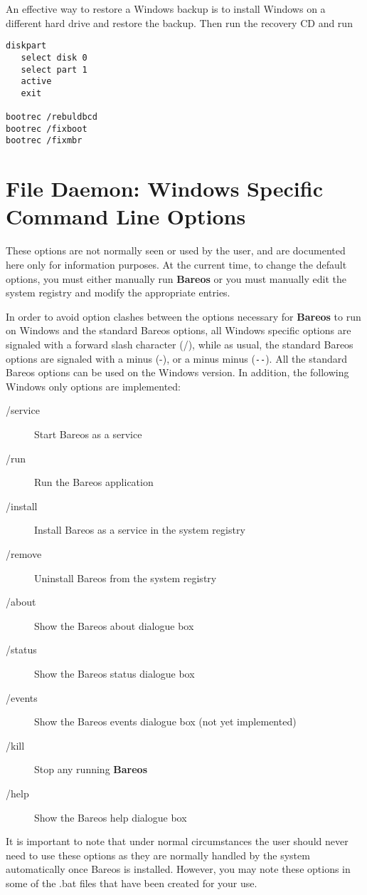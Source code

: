 An effective way to restore a Windows backup is to install Windows on a different
hard drive and restore the backup.  Then run the
recovery CD and run

\begin{verbatim}
diskpart
   select disk 0
   select part 1
   active
   exit

bootrec /rebuldbcd
bootrec /fixboot
bootrec /fixmbr
\end{verbatim}


\section{File Daemon: Windows Specific Command Line Options}

These options are not normally seen or used by the user, and are documented
here only for information purposes. At the current time, to change the default
options, you must either manually run {\bf Bareos} or you must manually edit
the system registry and modify the appropriate entries.

In order to avoid option clashes between the options necessary for {\bf
Bareos} to run on Windows and the standard Bareos options, all Windows
specific options are signaled with a forward slash character (/), while as
usual, the standard Bareos options are signaled with a minus (-), or a minus
minus (\verb:--:). All the standard Bareos options can be used on the Windows
version. In addition, the following Windows only options are implemented:

\begin{description}

\item [/service ]
   Start Bareos as a service

\item [/run ]
   Run the Bareos application

\item [/install ]
   Install Bareos as a service in the system registry

\item [/remove ]
   Uninstall Bareos from the system registry

\item [/about ]
   Show the Bareos about dialogue box

\item [/status ]
   Show the Bareos status dialogue box

\item [/events ]
   Show the Bareos events dialogue box (not  yet implemented)

\item [/kill ]
   Stop any running {\bf Bareos}

\item [/help ]
   Show the Bareos help dialogue box
\end{description}

It is important to note that under normal circumstances the user should never
need to use these options as they are normally handled by the system
automatically once Bareos is installed. However, you may note these options in
some of the .bat files that have been created for your use.
